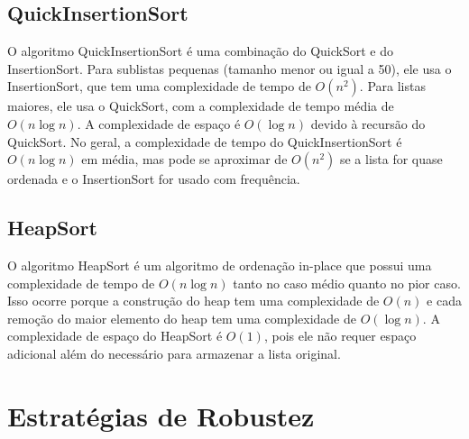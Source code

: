 \documentclass[a4paper,12pt]{article}
\begin{document}
\subsection{QuickInsertionSort}
\hspace*{1cm}

O algoritmo QuickInsertionSort é uma combinação do QuickSort e do InsertionSort. Para sublistas pequenas (tamanho menor ou igual a 50), ele usa o InsertionSort,
que tem uma complexidade de tempo de \(O(n^2)\). Para listas maiores, ele usa o QuickSort, com a complexidade de tempo média de \(O(n \log n)\). 
A complexidade de espaço é \(O(\log n)\) devido à recursão do QuickSort. No geral, a complexidade de tempo do QuickInsertionSort é \(O(n \log n)\) em média, 
mas pode se aproximar de \(O(n^2)\) se a lista for quase ordenada e o InsertionSort for usado com frequência.

\subsection{HeapSort}
\hspace*{1cm}

O algoritmo HeapSort é um algoritmo de ordenação in-place que possui uma complexidade de tempo de \(O(n \log n)\) tanto no caso médio quanto no pior caso. 
Isso ocorre porque a construção do heap tem uma complexidade de \(O(n)\) e cada remoção do maior elemento do heap tem uma complexidade de \(O(\log n)\). 
A complexidade de espaço do HeapSort é \(O(1)\), pois ele não requer espaço adicional além do necessário para armazenar a lista original.

\section{Estratégias de Robustez}
\hspace*{1cm}
\end{document}
